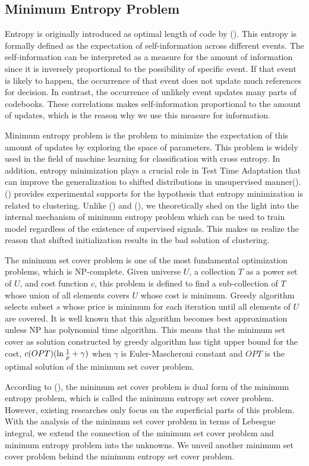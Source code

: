 \subsection{Minimum Entropy Problem}
Entropy is originally introduced as optimal length of code by (\cite{Shannon48, AnqiMY23}).
This entropy is formally defined as the expectation of self-information across different events.
The self-information can be interpreted as a measure for the amount of information 
since it is inversely proportional to the possibility of specific event.
If that event is likely to happen, the occurrence of that event does not update much references for decision.
In contrast, the occurrence of unlikely event updates many parts of codebooks.
These correlations makes self-information proportional to the amount of updates, 
which is the reason why we use this measure for information.

Minimum entropy problem is the problem to minimize the expectation 
of this amount of updates by exploring the space of parameters.
This problem is widely used in the field of machine learning for classification with cross entropy.
In addition, entropy minimization plays a crucial role in Test Time Adaptation 
that can improve the generalization to shifted distributions in unsupervised manner(\cite{WangSLOD21}). 
(\cite{OriRYM24}) provides experimental supports for the hypothesis that entropy minimization is related to clustering.
Unlike (\cite{WangSLOD21}) and (\cite{OriRYM24}), we theoretically shed on the light 
into the internal mechanism of minimum entropy problem 
which can be used to train model regardless of the existence of supervised signals.
This makes us realize the reason that shifted initialization results in the bad solution of clustering.

The minimum set cover problem is one of the most fundamental optimization problems, which is NP-complete.
Given universe $U$, a collection $T$ as a power set of $U$, and cost function $c$, 
this problem is defined to find a sub-collection of $T$ whose union of all elements covers $U$ whose cost is minimum.
Greedy algorithm selects subset $s$ whose price is minimum for each iteration until all elements of $U$ are covered.
It is well known that this algorithm becomes best approximation unless NP has polynomial time algorithm.
This means that the minimum set cover as solution constructed by greedy algorithm has tight upper bound 
for the cost, $c(OPT)(\ln{1 \over p}+\gamma)$ when $\gamma$ is Euler-Mascheroni constant 
and $OPT$ is the optimal solution of the minimum set cover problem.

According to (\cite{HalperinK05, CardinalFJ12}), the minimum set cover problem is dual form of the minimum entropy problem, 
which is called the minimum entropy set cover problem.
However, existing researches only focus on the superficial parts of this problem.
With the analysis of the minimum set cover problem in terms of Lebesgue integral, 
we extend the connection of the minimum set cover problem and minimum entropy problem into the unknowns.
We unveil another minimum set cover problem behind the minimum entropy set cover problem.